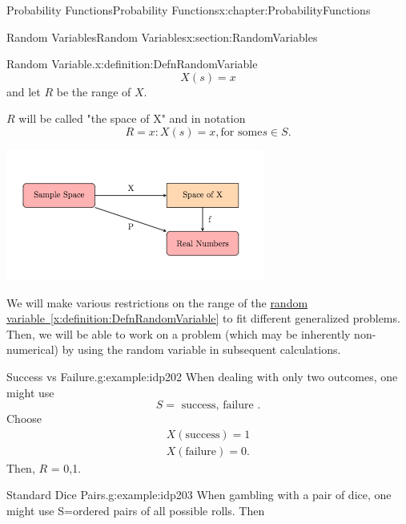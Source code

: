 \documentclass[oneside,10pt,]{book}
\newcommand{\xreffont}{\relax}
\numberwithin{equation}{section}
\begin{document}
\begin{chapterptx}{Probability Functions}{}{Probability Functions}{}{}{x:chapter:ProbabilityFunctions}
\begin{sectionptx}{Random Variables}{}{Random Variables}{}{}{x:section:RandomVariables}
\begin{definition}{Random Variable.}{x:definition:DefnRandomVariable}
\begin{equation*}
X(s) = x
\end{equation*}
and let \(R\)  be the range of \(X.\)%
\par
\(R\) will be called "the space of X" and in notation%
\begin{equation*}
R = { x : X(s)=x, \text{for some} s \in S } .
\end{equation*}
%
\end{definition}
%
\begin{image}{0}{1}{0}%
\includegraphics[width=\linewidth]{images/randomvariable.png}
\end{image}%
We will make various restrictions on the range of the \hyperref[x:definition:DefnRandomVariable]{random variable~{\xreffont\ref{x:definition:DefnRandomVariable}}} to fit different generalized problems. Then, we will be able to work on a problem (which may be inherently non-numerical) by using the random variable in subsequent calculations.%
\par
\begin{example}{Success vs Failure.}{g:example:idp202}%
When dealing with only two outcomes, one might use%
\begin{equation*}
S = \text{{ success, failure }}.
\end{equation*}
Choose%
\begin{gather*}
X( \text{success})=1\\
X( \text{failure})=0.
\end{gather*}
Then, \(R\) = \textbraceleft{}0,1\textbraceright{}.%
\end{example}
%
\par
\begin{example}{Standard Dice Pairs.}{g:example:idp203}%
When gambling with a pair of dice, one might use S=ordered pairs of all possible rolls.  Then%
\begin{equation*}

\end{equation*}
\end{example}
\end{sectionptx}
\end{chapterptx}
\end{document}
